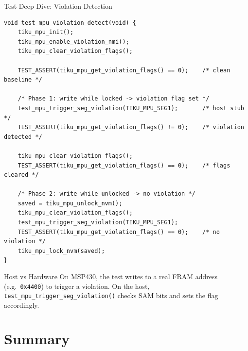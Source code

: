 \documentclass[aspectratio=169, 10pt]{beamer}
\begin{document}
\begin{frame}[fragile]{Test Deep Dive: Violation Detection}
\begin{lstlisting}[style=cstyle, title={test\_mem\_mpu.c --- Violation detection test}]
void test_mpu_violation_detect(void) {
    tiku_mpu_init();
    tiku_mpu_enable_violation_nmi();
    tiku_mpu_clear_violation_flags();

    TEST_ASSERT(tiku_mpu_get_violation_flags() == 0);    /* clean baseline */

    /* Phase 1: write while locked -> violation flag set */
    test_mpu_trigger_seg_violation(TIKU_MPU_SEG1);       /* host stub */
    TEST_ASSERT(tiku_mpu_get_violation_flags() != 0);    /* violation detected */

    tiku_mpu_clear_violation_flags();
    TEST_ASSERT(tiku_mpu_get_violation_flags() == 0);    /* flags cleared */

    /* Phase 2: write while unlocked -> no violation */
    saved = tiku_mpu_unlock_nvm();
    tiku_mpu_clear_violation_flags();
    test_mpu_trigger_seg_violation(TIKU_MPU_SEG1);
    TEST_ASSERT(tiku_mpu_get_violation_flags() == 0);    /* no violation */
    tiku_mpu_lock_nvm(saved);
}
\end{lstlisting}

\vspace{0.3em}
\begin{block}{Host vs Hardware}
On MSP430, the test writes to a real FRAM address (e.g.\ \texttt{0x4400}) to
trigger a violation. On the host, \texttt{test\_mpu\_trigger\_seg\_violation()}
checks SAM bits and sets the flag accordingly.
\end{block}
\end{frame}

\section{Summary}
\end{document}
